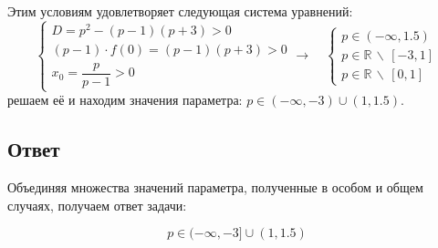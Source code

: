 Этим условиям удовлетворяет следующая система уравнений:
\begin {equation*}
    \begin {cases}
        D = p^2 - (p-1)(p+3)  > 0
        \\
        (p - 1) \cdot f(0) = (p-1)(p+3) > 0
        \\
        x_0 = \dfrac{p}{p-1} > 0
    \end {cases}
    \longrightarrow\quad
    \begin {cases}
        p \in (-\infty, 1.5)
        \\
        p \in \mathbb{R} \, \backslash \, [-3, 1]
        \\
        p \in \mathbb{R} \, \backslash \, [0, 1]
    \end {cases}
\end {equation*}
решаем её и находим значения параметра: $p \in (-\infty, -3) \cup (1, 1.5)$.

\subsection * {Ответ}
Объединяя множества значений параметра, полученные в особом и общем случаях, получаем ответ задачи:

\begin {equation*}
    \boxed{p \in (-\infty, -3] \cup (1, 1.5)}
\end {equation*}